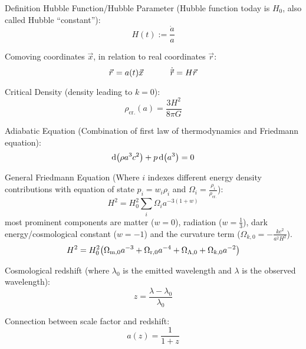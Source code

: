 			\noindent
			Definition Hubble Function/Hubble Parameter{} (Hubble function today is $H_0$, also called Hubble ``constant''):
			\begin{equation}
				H(t) := \frac{\dot{a}}{a}
			\end{equation}

			\noindent
			Comoving coordinates $\vec{x}$, in relation to real coordinates $\vec{r}$:
			\begin{equation}
				\vec{r} = a(t) \vec{x}
				\hsp
				\dot{\vec{r}} = H \vec{r}
			\end{equation}

			\noindent
			Critical Density (\ie density leading to $k=0$):
			\begin{equation}
				\rho_\text{cr.} (a) = \frac{3 H^2}{8 \pi G}
			\end{equation}

			\noindent
			Adiabatic Equation (Combination of first law of thermodynamics and Friedmann equation):
			\begin{equation}
				\dd \qty(\rho a^3 c^2) + p \dd (a^3) = 0
			\end{equation}

			\noindent
			General Friedmann Equation (Where $i$ indexes different energy density contributions with equation of state $p_i = w_i \rho_i$ and $\Omega_i = \frac{\rho_i}{\rho_\text{cr.}}$):
			\begin{equation}
				H^2 = H_0^2\sum_i \Omega_i a^{-3(1+w)}
			\end{equation}
			most prominent components are matter ($w=0$), radiation ($w=\frac{1}{3}$), dark energy/cosmological constant ($w=-1$) and the curvature term ($\Omega_{k,0}=-\frac{k c^2}{a^2 H^2}$).
			\begin{equation}
				H^2 = H_0^2 \qty(\Omega_{\text{m},0} a^{-3} + \Omega_{\text{r},0} a^{-4} + \Omega_{\Lambda,0} + \Omega_{k,0} a^{-2})
			\end{equation}

			Cosmological redshift (where $\lambda_0$ is the emitted wavelength and $\lambda$ is the observed wavelength):
			\begin{equation}
				z = \frac{\lambda - \lambda_0}{\lambda_0}
			\end{equation}

			\noindent
			Connection between scale factor and redshift:
			\begin{equation}
				a(z) = \frac{1}{1+z}
			\end{equation}

